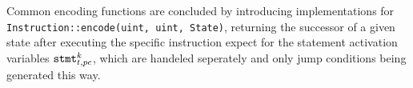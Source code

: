 \noindent
Common encoding functions are concluded by introducing implementations for \lstinline[style=c++, basicstyle=\normalsize\ttfamily]{Instruction::encode(uint, uint, State)}, returning the successor of a given state after executing the specific instruction expect for the statement activation variables $\texttt{stmt}^k_{t, pc}$, which are handeled seperately and only jump conditions being generated this way.

\newpage


\newcommand{\defencode}[1]{
  \vfill
  \par\noindent
  #1
  \par\noindent
  \rule[0.5\baselineskip]{\textwidth}{0.1pt}%
}

\newlength{\encodeskip}
\setlength{\encodeskip}{.5\baselineskip}



